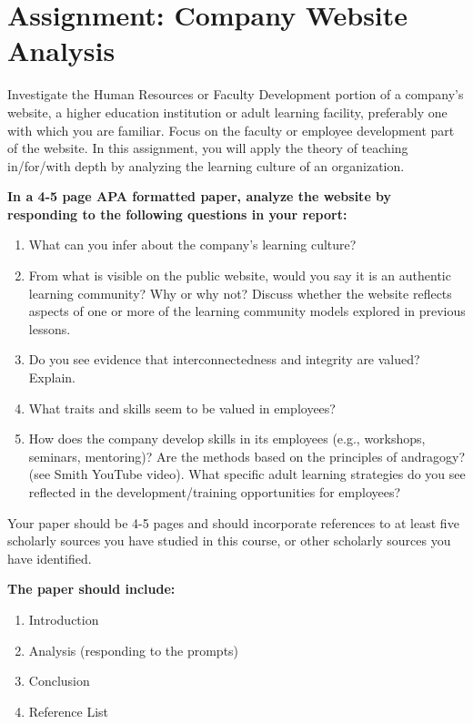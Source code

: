 \documentclass[
]{book}
\providecommand{\tightlist}{%
  \setlength{\itemsep}{0pt}\setlength{\parskip}{0pt}}
\begin{document}
\hypertarget{assignment-company-website-analysis}{%
\section*{Assignment: Company Website Analysis}\label{assignment-company-website-analysis}}

\begin{assessment}
Investigate the Human Resources or Faculty Development portion of a company's website, a higher education institution or adult learning facility, preferably one with which you are familiar. Focus on the faculty or employee development part of the website. In this assignment, you will apply the theory of teaching in/for/with depth by analyzing the learning culture of an organization.

\textbf{In a 4-5 page APA formatted paper, analyze the website by responding to the following questions in your report:}

\begin{enumerate}
\def\labelenumi{\arabic{enumi}.}
\tightlist
\item
  What can you infer about the company's learning culture?\\
\item
  From what is visible on the public website, would you say it is an authentic learning community? Why or why not? Discuss whether the website reflects aspects of one or more of the learning community models explored in previous lessons.\\
\item
  Do you see evidence that interconnectedness and integrity are valued? Explain.\\
\item
  What traits and skills seem to be valued in employees?\\
\item
  How does the company develop skills in its employees (e.g., workshops, seminars, mentoring)? Are the methods based on the principles of andragogy? (see Smith YouTube video). What specific adult learning strategies do you see reflected in the development/training opportunities for employees?
\end{enumerate}

Your paper should be 4-5 pages and should incorporate references to at least five scholarly sources you have studied in this course, or other scholarly sources you have identified.

\textbf{The paper should include:}

\begin{enumerate}
\def\labelenumi{\arabic{enumi}.}
\tightlist
\item
  Introduction\\
\item
  Analysis (responding to the prompts)\\
\item
  Conclusion\\
\item
  Reference List
\end{enumerate}
\end{assessment}
\end{document}
